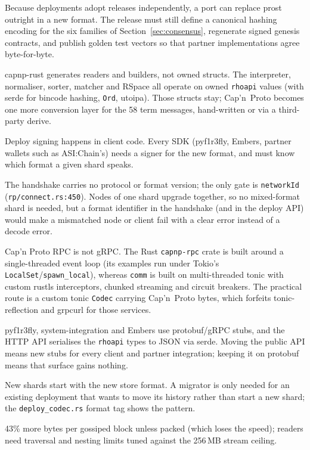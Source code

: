 \documentclass[10pt,a4paper]{article}
\newcommand{\f}[1]{\nolinkurl{#1}}
\newcommand{\capnp}{Cap'n~Proto}
\begin{document}
\begin{description}[style=nextline,leftmargin=0pt,font=\sffamily\bfseries\small]
\item[A new shard format] Because deployments adopt releases independently, a port can replace
  prost outright in a new format. The release must still define a canonical hashing encoding for
  the six families of Section~\ref{sec:consensus}, regenerate signed genesis contracts, and publish
  golden test vectors so that partner implementations agree byte-for-byte.
\item[The Rholang AST] capnp-rust generates readers and builders, not owned structs. The
  interpreter, normaliser, sorter, matcher and RSpace all operate on owned \f{rhoapi} values
  (with serde for bincode hashing, \f{Ord}, utoipa). Those structs stay; \capnp{} becomes one
  more conversion layer for the 58 term messages, hand-written or via a third-party derive.
\item[Client SDKs] Deploy signing happens in client code. Every SDK (pyf1r3fly, Embers,
  partner wallets such as ASI:Chain's) needs a signer for the new format, and must know which
  format a given shard speaks.
\item[Format identification] The handshake carries no protocol or format version; the only gate is
  \f{networkId} (\f{rp/connect.rs:450}). Nodes of one shard upgrade together, so no mixed-format
  shard is needed, but a format identifier in the handshake (and in the deploy API) would make a
  mismatched node or client fail with a clear error instead of a decode error.
\item[RPC and tooling] Cap'n Proto RPC is not gRPC. The Rust \f{capnp-rpc} crate is built around
  a single-threaded event loop (its examples run under Tokio's \f{LocalSet}/\f{spawn_local}),
  whereas \f{comm} is built on multi-threaded tonic with custom rustls interceptors, chunked
  streaming and circuit breakers. The practical route is a custom tonic \f{Codec} carrying
  \capnp{} bytes, which forfeits tonic-reflection and grpcurl for those services.
\item[External APIs] pyf1r3fly, system-integration and Embers use protobuf/gRPC stubs, and the
  HTTP API serialises the \f{rhoapi} types to JSON via serde. Moving the public API means new stubs
  for every client and partner integration; keeping it on protobuf means that surface gains nothing.
\item[Storage] New shards start with the new store format. A migrator is only needed for an
  existing deployment that wants to move its history rather than start a new shard; the
  \f{deploy_codec.rs} format tag shows the pattern.
\item[Size and safety] 43\% more bytes per gossiped block unless packed (which loses the speed);
  readers need traversal and nesting limits tuned against the 256\,MB stream ceiling.
\end{description}
\end{document}
